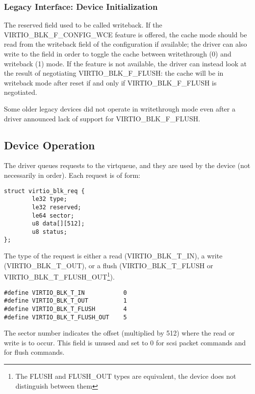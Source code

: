 \subsubsection{Legacy Interface: Device Initialization}\label{sec:Device Types / Block Device / Device Initialization / Legacy Interface: Device Initialization}

The reserved field used to be called writeback.  If the
VIRTIO_BLK_F_CONFIG_WCE feature is offered, the cache mode should be
read from the writeback field of the configuration if available; the
driver can also write to the field in order to toggle the cache
between writethrough (0) and writeback (1) mode.  If the feature is
not available, the driver can instead look at the result of
negotiating VIRTIO_BLK_F_FLUSH: the cache will be in writeback mode
after reset if and only if VIRTIO_BLK_F_FLUSH is negotiated.

Some older legacy devices did not operate in writethrough mode even
after a driver announced lack of support for VIRTIO_BLK_F_FLUSH.

\subsection{Device Operation}\label{sec:Device Types / Block Device / Device Operation}

The driver queues requests to the virtqueue, and they are used by
the device (not necessarily in order). Each request is of form:

\begin{lstlisting}
struct virtio_blk_req {
        le32 type;
        le32 reserved;
        le64 sector;
        u8 data[][512];
        u8 status;
};
\end{lstlisting}

The type of the request is either a read (VIRTIO_BLK_T_IN), a write
(VIRTIO_BLK_T_OUT), or a flush (VIRTIO_BLK_T_FLUSH or
VIRTIO_BLK_T_FLUSH_OUT\footnote{The FLUSH and FLUSH_OUT types are equivalent, the device does not
distinguish between them
}).

\begin{lstlisting}
#define VIRTIO_BLK_T_IN           0
#define VIRTIO_BLK_T_OUT          1
#define VIRTIO_BLK_T_FLUSH        4
#define VIRTIO_BLK_T_FLUSH_OUT    5
\end{lstlisting}

The sector number indicates the offset (multiplied by 512) where
the read or write is to occur. This field is unused and set to 0
for scsi packet commands and for flush commands.

